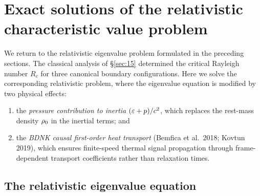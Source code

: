 %

\section{Exact solutions of the relativistic characteristic value problem}
\label{sec:rel-15}

We return to the relativistic eigenvalue problem formulated in the
preceding sections. The classical analysis of \S\ref{sec:15} determined
the critical Rayleigh number $R_c$ for three canonical boundary
configurations. Here we solve the corresponding relativistic problem,
where the eigenvalue equation is modified by two physical effects:
\begin{enumerate}
\item[(i)] the \emph{pressure contribution to inertia}
  $(\varepsilon + p)/c^{2}$, which replaces the rest-mass density
  $\rho_0$ in the inertial terms; and
\item[(ii)] the \emph{BDNK causal first-order heat transport}
  (Bemfica et al.\ 2018; Kovtun 2019), which ensures finite-speed
  thermal signal propagation through frame-dependent transport
  coefficients rather than relaxation times.
\end{enumerate}

\subsection{The relativistic eigenvalue equation}
\label{sec:rel-15-eigen}

